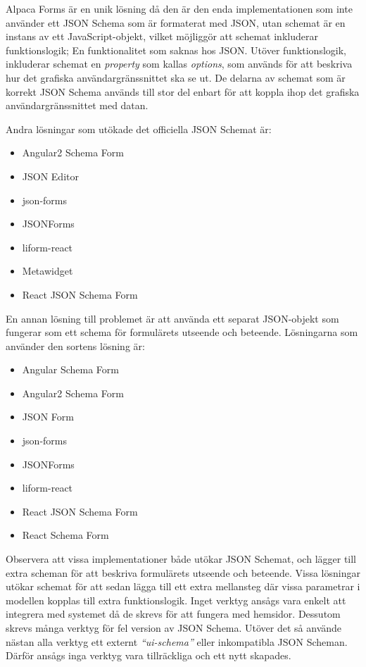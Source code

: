 Alpaca Forms är en unik lösning då den är den enda implementationen som inte använder ett JSON Schema som är formaterat med JSON, utan schemat är en instans av ett JavaScript-objekt, vilket möjliggör att schemat inkluderar funktionslogik; En funktionalitet som saknas hos JSON. Utöver funktionslogik, inkluderar schemat en \textit{property} som kallas \textit{options}, som används för att beskriva hur det grafiska användargränssnittet ska se ut. De delarna av schemat som är korrekt JSON Schema används till stor del enbart för att koppla ihop det grafiska användargränssnittet med datan. \cite{GitanaSoftwareInc.}

Andra lösningar som utökade det officiella JSON Schemat är:
\begin{itemize}
	\item Angular2 Schema Form \cite{MakinaCorpus}
	\item JSON Editor \cite{JeremyDorn}
	\item json-forms \cite{Brutusin.org}
	\item JSONForms \cite{EclipseSource}
	\item liform-react \cite{NachoMartin}
	\item Metawidget \cite{Metawidget}
	\item React JSON Schema Form \cite{MozillaServices}
\end{itemize}

En annan lösning till problemet är att använda ett separat JSON-objekt som fungerar som ett schema för formulärets utseende och beteende. Lösningarna som använder den sortens lösning är:
\begin{itemize}
	\item Angular Schema Form \cite{Textalk}
	\item Angular2 Schema Form \cite{MakinaCorpus}
	\item JSON Form \cite{Joshfire}
	\item json-forms \cite{Brutusin.org}
	\item JSONForms \cite{EclipseSource}
	\item liform-react \cite{NachoMartin}
	\item React JSON Schema Form \cite{MozillaServices}
	\item React Schema Form \cite{NetworkNewTechnologiesInc.}
\end{itemize}

Observera att vissa implementationer både utökar JSON Schemat, och lägger till extra scheman för att beskriva formulärets utseende och beteende. Vissa lösningar utökar schemat för att sedan lägga till ett extra mellansteg där vissa parametrar i modellen kopplas till extra funktionslogik. Inget verktyg ansågs vara enkelt att integrera med systemet då de skrevs för att fungera med hemsidor. Dessutom skrevs många verktyg för fel version av JSON Schema. Utöver det så använde nästan alla verktyg ett externt \textit{``ui-schema''} eller inkompatibla JSON Scheman. Därför ansågs inga verktyg vara tillräckliga och ett nytt skapades.


